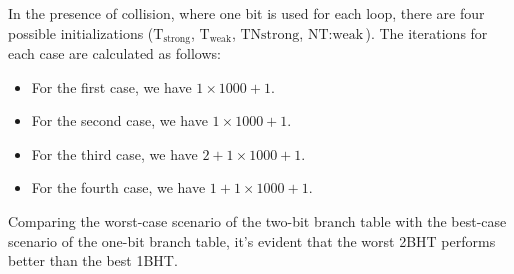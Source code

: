 In the presence of collision, where one bit is used for each loop, there are four possible initializations ($\text{T}_{\text{strong}}$, $\text{T}_{\text{weak}}$, $\text{TN}{\text{strong}}$, $\text{NT}:{\text{weak}}$). 
The iterations for each case are calculated as follows:
\begin{itemize}
    \item For the first case, we have $1 \times 1000 + 1$.
    \item For the second case, we have $1 \times 1000 + 1$.
    \item For the third case, we have $2 + 1 \times 1000 + 1$.
    \item For the fourth case, we have $1 + 1 \times 1000 + 1$.
\end{itemize}

Comparing the worst-case scenario of the two-bit branch table with the best-case scenario of the one-bit branch table, it's evident that the worst 2BHT performs better than the best 1BHT.